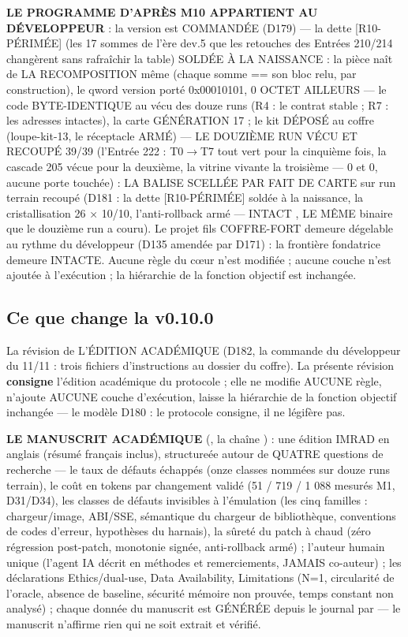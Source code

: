 \textbf{LE PROGRAMME D'APRÈS M10 APPARTIENT AU DÉVELOPPEUR} : la version
 est COMMANDÉE (D179) — la dette [R10-PÉRIMÉE] (les 17 sommes de
l'ère dev.5 que les retouches des Entrées 210/214 changèrent sans rafraîchir la
table) SOLDÉE À LA NAISSANCE : la pièce naît de LA RECOMPOSITION même (chaque
somme == son bloc relu, par construction), le qword version porté 0x00010101,
0 OCTET AILLEURS — le code BYTE-IDENTIQUE au vécu des douze runs (R4 : le contrat
stable ; R7 : les adresses intactes), la carte GÉNÉRATION 17 ; le kit
 DÉPOSÉ au coffre  (loupe-kit-13, le réceptacle
ARMÉ) — LE DOUZIÈME RUN VÉCU ET RECOUPÉ 39/39 (l'Entrée 222 : T0$\to$T7 tout
vert pour la cinquième fois, la cascade 205 vécue pour la deuxième, la vitrine
vivante la troisième — 0 et 0, aucune porte touchée) : LA BALISE
 SCELLÉE PAR FAIT DE CARTE sur run terrain recoupé (D181 :
la dette [R10-PÉRIMÉE] soldée à la naissance, la cristallisation 26 × 10/10,
l'anti-rollback armé —  INTACT , LE MÊME
binaire que le douzième run a couru). Le projet fils COFFRE-FORT demeure dégelable au rythme du
développeur (D135 amendée par D171) : la frontière fondatrice demeure INTACTE.
Aucune règle du cœur n'est modifiée ; aucune couche n'est ajoutée à l'exécution ;
la hiérarchie de la fonction objectif est inchangée.

\subsection{Ce que change la v0.10.0}\label{sec:nouveautes100}

La révision de L'ÉDITION ACADÉMIQUE (D182, la commande du développeur du
11/11 : trois fichiers d'instructions au dossier  du
coffre). La présente révision \textbf{consigne} l'édition académique du
protocole ; elle ne modifie AUCUNE règle, n'ajoute AUCUNE couche
d'exécution, laisse la hiérarchie de la fonction objectif inchangée — le
modèle D180 : le protocole consigne, il ne légifère pas.

\textbf{LE MANUSCRIT ACADÉMIQUE} (,
la chaîne ) : une édition IMRAD en anglais
(résumé français inclus), structureée autour de QUATRE questions de
recherche — le taux de défauts échappés (onze classes nommées sur douze
runs terrain), le coût en tokens par changement validé (51 / 719 / 1 088
mesurés M1, D31/D34), les classes de défauts invisibles à l'émulation (les
cinq familles : chargeur/image, ABI/SSE, sémantique du chargeur de
bibliothèque, conventions de codes d'erreur, hypothèses du harnais), la
sûreté du patch à chaud (zéro régression post-patch, monotonie signée,
anti-rollback armé) ; l'auteur humain unique (l'agent IA décrit en
méthodes et remerciements, JAMAIS co-auteur) ; les déclarations
Ethics/dual-use, Data Availability, Limitations (N=1, circularité de
l'oracle, absence de baseline, sécurité mémoire non prouvée, temps
constant non analysé) ; chaque donnée du manuscrit est GÉNÉRÉE depuis le
journal par  — le manuscrit
n'affirme rien qui ne soit extrait et vérifié.

